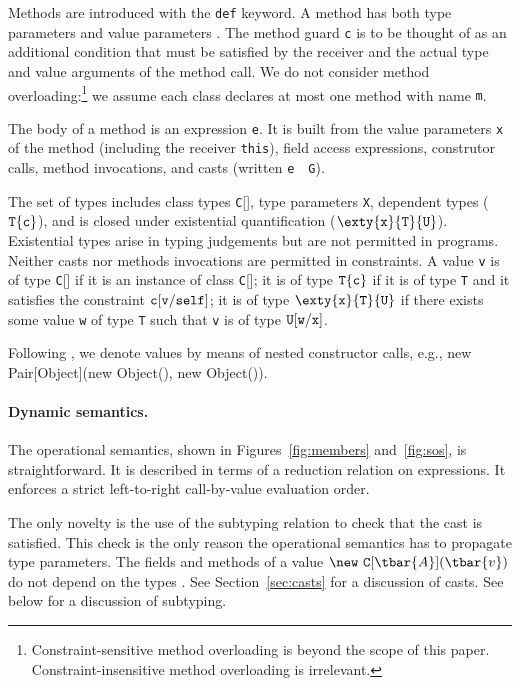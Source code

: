 Methods are introduced with the {\tt def} keyword. A method has both type parameters {} and value parameters {}. The method guard {\tt c} is to be thought of as an additional condition that must be satisfied by the receiver and the actual type and value arguments of the method call. We do not consider method overloading:\footnote{Constraint-sensitive method overloading is beyond the scope of this paper. Constraint-insensitive method overloading is irrelevant.} we assume each class declares at most one method with name {\tt m}.

The body of a method is an expression {\tt e}. It is built from the value parameters {\tt x} of the method (including the receiver {\tt this}), field access expressions, construtor calls, method invocations, and casts (written {\tt e}~\as~{\tt G}).

The set of types includes class types {\tt C}[], type parameters {\tt X}, dependent types ($\tt T\{c\}$), and is closed under existential quantification ($\exty{\tt x}{\tt T}{\tt U}$). Existential types arise in typing judgements but are not permitted in programs. Neither casts nor methods invocations are permitted in constraints. A value {\tt v} is of type {\tt C}[] if it is an instance of class {\tt C}[]; it is of type $\tt T\{c\}$ if it is of type {\tt T} and it satisfies the constraint $\tt c[v/self]$; it is of type $\exty{\tt x}{\tt T}{\tt U}$ if there exists some value {\tt w} of type {\tt T} such that {\tt v} is of type
$\tt U[w/x]$.

Following \FJ{}, we denote values by means of nested constructor calls, e.g., new Pair[Object](new Object(), new Object()).

\paragraph{Dynamic semantics.}
The operational semantics, shown in Figures~\ref{fig:members} and~\ref{fig:sos}, is straightforward. It is described in terms of a reduction relation on expressions. It enforces a strict left-to-right call-by-value evaluation order.

The only novelty is the use of the subtyping relation to check that the cast is satisfied. This check is the only reason the operational semantics has to propagate type parameters. The fields and methods of a value $\new~{\tt C}[\tbar{A}](\tbar{v})$ do not depend on the types . See Section~\ref{sec:casts} for a discussion of casts. See below for a discussion of subtyping.

